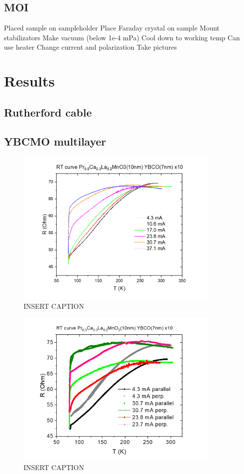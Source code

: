 \documentclass{comjnl}
\begin{document}
\subsection{MOI}
Placed sample on sampleholder
Place Faraday crystal on sample
Mount stabilizators
Make vacuum (below 1e-4 mPa)
Cool down to working temp
Can use heater 
Change current and polarization
Take pictures


\section{Results}  \label{Sec:Results}
\subsection{Rutherford cable}


\subsection{YBCMO multilayer}
\begin{figure}[h]
\centering
\includegraphics[width=100mm]{Bilde1.png}
\caption{INSERT CAPTION \label{fig:multilayer1}}
\end{figure}

\begin{figure}[h]
\centering
\includegraphics[width=100mm]{Bilde2.png}
\caption{INSERT CAPTION \label{fig:multilayer2}}
\end{figure}
\end{document}
